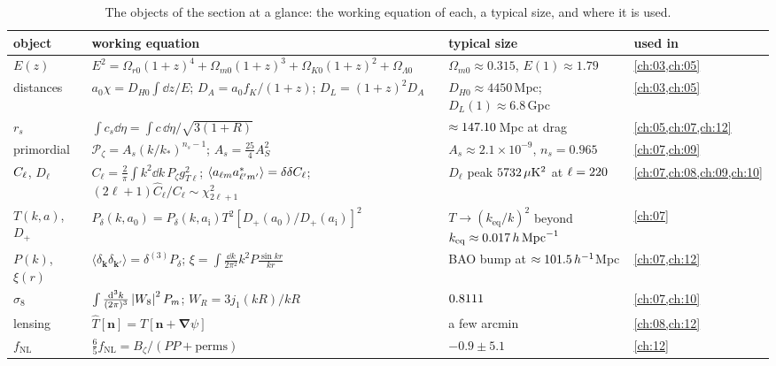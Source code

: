\begin{table}[htbp]
\centering
\small
\renewcommand{\arraystretch}{1.25}
\begin{tabularx}{\linewidth}{@{}>{\raggedright\arraybackslash}p{2.5cm}
                               >{\raggedright\arraybackslash}X
                               >{\raggedright\arraybackslash}p{3.7cm}
                               >{\raggedright\arraybackslash}p{1.7cm}@{}}
\toprule
object & working equation & typical size & used in\\\midrule
$E(z)$ & $E^2=\Omega_{r0}(1+z)^4+\Omega_{m0}(1+z)^3+\Omega_{K0}(1+z)^2+\Omega_{\Lambda0}$ & $\Omega_{m0}\approx0.315$, $E(1)\approx1.79$ & \cref{ch:03,ch:05}\\
distances & $a_0\chi=D_{H0}\!\int\dd z/E$; $D_A=a_0f_K/(1+z)$; $D_L=(1+z)^2D_A$ & $D_{H0}\approx4450$\,Mpc; $D_L(1)\approx6.8$\,Gpc & \cref{ch:03,ch:05}\\
$r_s$ & $\int c_s\dd\eta=\int c\,\dd\eta/\sqrt{3(1+R)}$ & $\approx147.10$\,Mpc at drag & \cref{ch:05,ch:07,ch:12}\\
primordial & $\mathcal P_\zeta=A_s(k/k_*)^{n_s-1}$; $A_s=\frac{25}{4}A_S^2$ & $A_s\approx2.1\times10^{-9}$, $n_s=0.965$ & \cref{ch:07,ch:09}\\
$C_\ell$, $D_\ell$ & $C_\ell=\frac2\pi\!\int k^2\dd k\,P_\zeta g_{T\ell}^2$; $\langle a_{\ell m} a^*_{\ell'm'}\rangle=\delta\delta C_\ell$; $(2\ell+1)\widehat C_\ell/C_\ell\sim\chi^2_{2\ell+1}$ & $D_\ell$ peak $5732\,\mu\mathrm K^2$ at $\ell=220$ & \cref{ch:07,ch:08,ch:09,ch:10}\\
$T(k,a)$, $D_+$ & $P_\delta(k,a_0)=P_\delta(k,a_{\mathrm i})T^2[D_+(a_0)/D_+(a_{\mathrm i})]^2$ & $T\to(k_{\mathrm{eq}}/k)^2$ beyond $k_{\mathrm{eq}}\approx0.017\,h\,\mathrm{Mpc}^{-1}$ & \cref{ch:07}\\
$P(k)$, $\xi(r)$ & $\langle\delta_{\bm k}\delta_{\bm k'}\rangle=\delta^{(3)}P_\delta$; $\xi=\!\int\!\frac{\dd k}{2\pi^2}k^2P\frac{\sin kr}{kr}$ & BAO bump at $\approx101.5\,h^{-1}$Mpc & \cref{ch:07,ch:12}\\
$\sigma_8$ & $\int\frac{\mathrm{d}^3k}{(2\pi)^3}\left\lvert W_8\right\rvert^2P_m$; $W_R=3j_1(kR)/kR$ & $0.8111$ & \cref{ch:07,ch:10}\\
lensing & $\hat T[\bm n]=T[\bm n+\bm\nabla\psi]$ & a few arcmin & \cref{ch:08,ch:12}\\
$f_{\mathrm{NL}}$ & $\frac65f_{\mathrm{NL}}=B_\zeta/(PP+\text{perms})$ & $-0.9\pm5.1$ & \cref{ch:12}\\
\bottomrule
\end{tabularx}
\caption{The objects of the section at a glance: the working equation of each, a typical size, and where it is used.}
\end{table}


